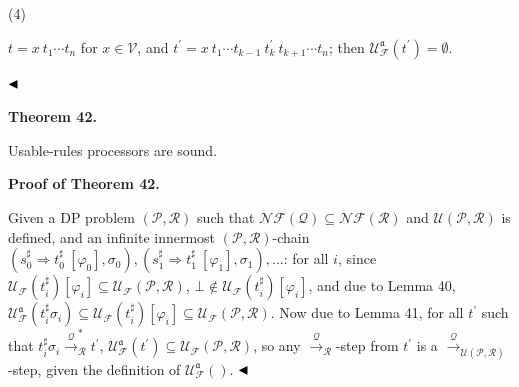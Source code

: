  
 
\par\noindent  (4) 
 
$t={x}\ {{t}_{1}\cdots{t}_{n}}$ for $x\in\mathcal{V}$, and $t^{\prime}={{{x}\ {{t}_{1}\cdots{t}_{k-1}}}\ {t_{k}^{\prime}}}\ {{t}_{k+1}\cdots{t}_{n}}$; then $\mathcal{U}_{\mathcal{F}}^{\mathfrak{a}}(t^{\prime})=\emptyset$.\par
 
 
  
$\hfill\blacktriangleleft$\par
 
 
 
\par\medskip\noindent\textbf{Theorem 42.}\par
 
 
Usable-rules processors are sound.\par
 
 
 
 
 
\par\medskip\noindent\textbf{Proof of Theorem 42.}\par
 
 
Given a DP problem $(\mathcal{P},\mathcal{R})$ such that $\mathcal{N}\!\mathcal{F}(\mathcal{Q})\subseteq\mathcal{N}\!\mathcal{F}(\mathcal{R})$ and $\mathcal{U}(\mathcal{P},\mathcal{R})$ is defined, and an infinite innermost $(\mathcal{P},\mathcal{R})$-chain $({s_{0}^{\sharp}}\Rightarrow{t_{0}^{\sharp}}\ [\varphi_{0}],\sigma_{0}),({s_{1}^{\sharp}}\Rightarrow{t_{1}^{\sharp}}\ [\varphi_{1}],\sigma_{1}),\ldots$: for all $i$, since $\mathcal{U}_{\mathcal{F}}(t_{i}^{\sharp})[\varphi_{i}]\subseteq\mathcal{U}_{\mathcal{F}}(\mathcal{P},\mathcal{R})$, $\bot\notin\mathcal{U}_{\mathcal{F}}(t_{i}^{\sharp})[\varphi_{i}]$, and due to Lemma 40, $\mathcal{U}_{\mathcal{F}}^{\mathfrak{a}}(t_{i}^{\sharp}\sigma_{i})\subseteq\mathcal{U}_{\mathcal{F}}(t_{i}^{\sharp})[\varphi_{i}]\subseteq\mathcal{U}_{\mathcal{F}}(\mathcal{P},\mathcal{R})$. Now due to Lemma 41, for all $t^{\prime}$ such that $t_{i}^{\sharp}\sigma_{i}\xrightarrow{\scriptscriptstyle\mathcal{Q}}_{\mathcal{R}}^{*}t^{\prime}$, $\mathcal{U}_{\mathcal{F}}^{\mathfrak{a}}(t^{\prime})\subseteq\mathcal{U}_{\mathcal{F}}(\mathcal{P},\mathcal{R})$, so any $\xrightarrow{\scriptscriptstyle\mathcal{Q}}_{\mathcal{R}}$-step from $t^{\prime}$ is a $\xrightarrow{\scriptscriptstyle\mathcal{Q}}_{\mathcal{U}(\mathcal{P},\mathcal{R})}$-step, given the definition of $\mathcal{U}_{\mathcal{F}}^{\mathfrak{a}}()$. $\hfill\blacktriangleleft$\par
 
